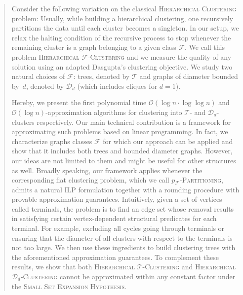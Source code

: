 \begin{abstract}
    Consider the following variation on the classical \textsc{Hierarchical Clustering} problem: Usually, while building a hierarchical clustering, one recursively partitions the data until each cluster becomes a singleton. In our setup, we relax the halting condition of the recursive process to stop whenever the remaining cluster is a graph belonging to a given class $\mathcal{F}$. We call this problem \textsc{Hierarchical $\mathcal{F}$-Clustering} and we measure the quality of any solution using an adapted Dasgupta's clustering objective. We study two natural choices of $\mathcal{F}$: trees, denoted by $\mathcal{T}$ and graphs of diameter bounded by~$d$, denoted by $\mathcal{D}_d$ (which includes cliques for $d=1$).

    Hereby, we present the first polynomial time $\mathcal{O}(\log n\cdot\log\log n)$ and $\mathcal{O}(\log n)$-approximation algorithms for clustering into $\mathcal{T}$- and $\mathcal{D}_d$-clusters respectively.
    Our main technical contribution is a framework for approximating such problems based on linear programming. In fact, we characterize graphs classes $\mathcal{F}$ for which our approach can be applied and show that it includes both trees and bounded diameter graphs. However, our ideas are not limited to them and might be useful for other structures as well. Broadly speaking, our framework applies whenever the corresponding flat clustering problem, which we call \textsc{$p_{\mathcal{F}}$-Partitioning}, admits a natural ILP formulation together with a rounding procedure with provable approximation guarantees. Intuitively, given a set of vertices called terminals, the problem is to find an edge set whose removal results in satisfying certain vertex-dependent structural predicates for each terminal. For example, excluding all cycles going through terminals or ensuring that the diameter of all clusters with respect to the terminals is not too large. We then use these ingredients to build clustering trees with the aforementioned approximation guarantees. To complement these results, we show that both \textsc{Hierarchical $\mathcal{T}$-Clustering} and \textsc{Hierarchical $\mathcal{D}_d$-Clustering} cannot be approximated within any constant factor under the \textsc{Small Set Expansion Hypothesis}.
\end{abstract}
